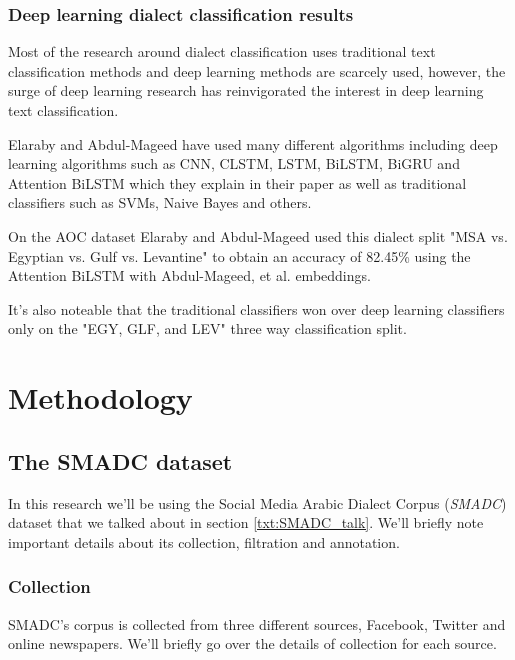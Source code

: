 \documentclass[12pt]{diazessay}
\begin{document}
        
        \subsubsection{Deep learning dialect classification results}
        Most of the research around dialect classification uses traditional text classification methods and deep learning methods are scarcely used, however, the surge of deep learning research has reinvigorated the interest in deep learning text classification.
        
        Elaraby and Abdul-Mageed have used many different algorithms including deep learning algorithms such as CNN, CLSTM, LSTM, BiLSTM, BiGRU and Attention BiLSTM which they explain in their paper as well as traditional classifiers such as SVMs, Naive Bayes and others\cite{elaraby-abdul-mageed-2018-deep}.
        
        On the AOC dataset Elaraby and Abdul-Mageed used this dialect split "MSA vs. Egyptian vs. Gulf vs. Levantine" to obtain an accuracy of 82.45\% using the Attention BiLSTM with Abdul-Mageed, et al. embeddings\cite{elaraby-abdul-mageed-2018-deep}.
        
        It's also noteable that the traditional classifiers won over deep learning classifiers only on the "EGY, GLF, and LEV" three way classification split\cite{elaraby-abdul-mageed-2018-deep}.
        
    
    \section{Methodology}
        
            \subsection{The SMADC dataset}
            In this research we'll be using the Social Media Arabic Dialect Corpus (\emph{SMADC}) dataset that we talked about in section \ref{txt:SMADC_talk}. We'll briefly note important details about its collection, filtration and annotation.
            
                \subsubsection{Collection}
                SMADC's corpus is collected from three different sources, Facebook, Twitter and online newspapers. We'll briefly go over the details of collection for each source. 
                
\end{document}
